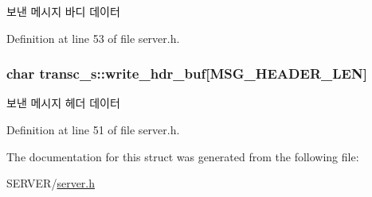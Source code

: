 보낸 메시지 바디 데이터 



Definition at line 53 of file server.\-h.

\hypertarget{structtransc__s_aa3ecd0837d30a152889f2583d176bdc9}{
\subsubsection[{write\-\_\-hdr\-\_\-buf}]{\setlength{\rightskip}{0pt plus 5cm}char transc\-\_\-s\-::write\-\_\-hdr\-\_\-buf\mbox{[}{\bf M\-S\-G\-\_\-\-H\-E\-A\-D\-E\-R\-\_\-\-L\-E\-N}\mbox{]}}}\label{structtransc__s_aa3ecd0837d30a152889f2583d176bdc9}


보낸 메시지 헤더 데이터 



Definition at line 51 of file server.\-h.



The documentation for this struct was generated from the following file\-:\begin{DoxyCompactItemize}
\item 
S\-E\-R\-V\-E\-R/\hyperlink{server_8h}{server.\-h}\end{DoxyCompactItemize}
